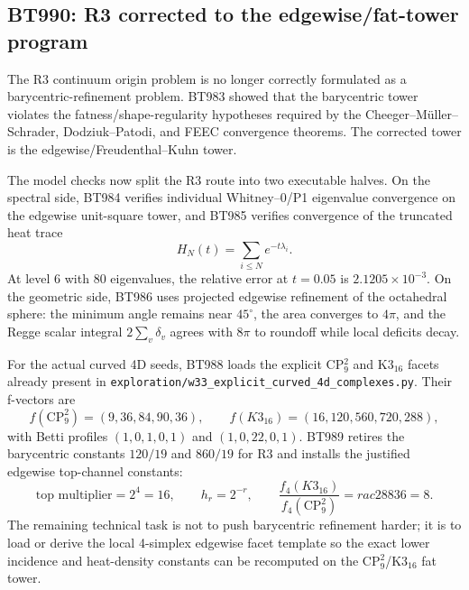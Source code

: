 \subsection*{BT990: R3 corrected to the edgewise/fat-tower program}

The R3 continuum origin problem is no longer correctly formulated as a
barycentric-refinement problem.  BT983 showed that the barycentric tower violates
the fatness/shape-regularity hypotheses required by the Cheeger--M\"uller--
Schrader, Dodziuk--Patodi, and FEEC convergence theorems.  The corrected tower is
the edgewise/Freudenthal--Kuhn tower.

The model checks now split the R3 route into two executable halves.  On the
spectral side, BT984 verifies individual Whitney--0/P1 eigenvalue convergence on
the edgewise unit-square tower, and BT985 verifies convergence of the truncated
heat trace
\[
  H_N(t)=\sum_{i\le N} e^{-t\lambda_i}.
\]
At level 6 with 80 eigenvalues, the relative error at \(t=0.05\) is
\(2.1205\times 10^{-3}\).  On the geometric side, BT986 uses projected edgewise
refinement of the octahedral sphere: the minimum angle remains near
\(45^\circ\), the area converges to \(4\pi\), and the Regge scalar integral
\(2\sum_v \delta_v\) agrees with \(8\pi\) to roundoff while local deficits decay.

For the actual curved 4D seeds, BT988 loads the explicit CP\(^2_9\) and
K3\(_{16}\) facets already present in
\texttt{exploration/w33\_explicit\_curved\_4d\_complexes.py}.  Their f-vectors
are
\[
  f(\mathrm{CP}^2_9)=(9,36,84,90,36),\qquad
  f(K3_{16})=(16,120,560,720,288),
\]
with Betti profiles \((1,0,1,0,1)\) and \((1,0,22,0,1)\).  BT989 retires the
barycentric constants \(120/19\) and \(860/19\) for R3 and installs the justified
edgewise top-channel constants:
\[
  \text{top multiplier}=2^4=16,\qquad h_r=2^{-r},\qquad
  \frac{f_4(K3_{16})}{f_4(\mathrm{CP}^2_9)}=rac{288}{36}=8.
\]
The remaining technical task is not to push barycentric refinement harder; it is
to load or derive the local 4-simplex edgewise facet template so the exact lower
incidence and heat-density constants can be recomputed on the CP\(^2_9\)/K3\(_{16}\)
fat tower.
